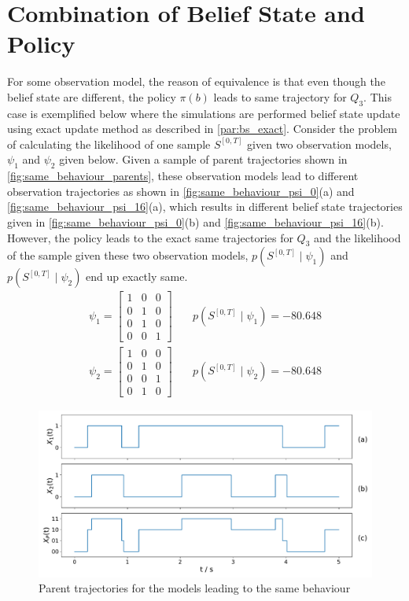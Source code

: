\section*{Combination of Belief State and Policy}
\label{ap:eq_classes_same_behaviour}
For some observation model, the reason of equivalence is that even though the belief state are different, the policy $ \pi(b) $ leads to same trajectory for $ Q_3 $. This case is exemplified below where the simulations are performed belief state update using exact update method as described in \cref{par:bs_exact}. Consider the problem of calculating the likelihood of one sample $ S^{[0,T]} $ given two observation models, $ \psi_1 $ and $ \psi_2 $ given below. Given a sample of parent trajectories shown in \autoref{fig:same_behaviour_parents}, these observation models lead to different observation trajectories as shown in \autoref{fig:same_behaviour_psi_0}(a) and \autoref{fig:same_behaviour_psi_16}(a), which results in different belief state trajectories given in \autoref{fig:same_behaviour_psi_0}(b) and \autoref{fig:same_behaviour_psi_16}(b). However, the policy leads to the exact same trajectories for $ Q_3 $ and the likelihood of the sample given these two observation models, $ p(S^{[0,T]} \mid \psi_1 ) $ and $ p(S^{[0,T]} \mid \psi_2 ) $ end up exactly same.
\begin{align}
\psi_{1} =
\begin{bmatrix}
1 & 0 & 0 \\
0 & 1 & 0 \\
0 & 1 & 0 \\
0 & 0 & 1
\end{bmatrix} &\quad
p(S^{[0,T]} \mid \psi_1 ) = -80.648 \label{eq:psi_1_1}\\
\psi_{2} =
\begin{bmatrix}
1 & 0 & 0 \\
0 & 1 & 0 \\
0 & 0 & 1 \\
0 & 1 & 0
\end{bmatrix} &\quad
p(S^{[0,T]} \mid \psi_2 ) = -80.648
\label{eq:psi_16}
\end{align}
\begin{figure}[H]
	\begin{center}
		\includegraphics[width=.90\textwidth]{figures/equivalence_classes/same_behaviour/parent_traj}
		\caption[Parent trajectories for the models leading to the same belief state]{Parent trajectories for the models leading to the same behaviour}
		\label{fig:same_behaviour_parents}
	\end{center}
\end{figure}
